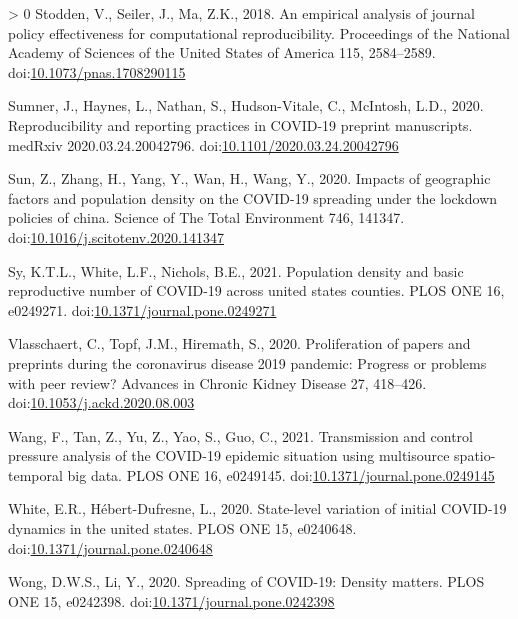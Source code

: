 \documentclass[]{elsarticle} %
\newlength{\cslhangindent}
\newenvironment{CSLReferences}[3] %
 {%
  \setlength{\parindent}{0pt}
  \ifodd #1 \everypar{\setlength{\hangindent}{\cslhangindent}}\ignorespaces\fi
  \ifnum #2 > 0
  \setlength{\parskip}{#2\baselineskip}
  \fi
 }%
 {}
\begin{document}
\begin{CSLReferences}{1}{0}
\leavevmode\hypertarget{ref-Stodden2018empirical}{}%
Stodden, V., Seiler, J., Ma, Z.K., 2018. An empirical analysis of
journal policy effectiveness for computational reproducibility.
Proceedings of the National Academy of Sciences of the United States of
America 115, 2584--2589.
doi:\href{https://doi.org/10.1073/pnas.1708290115}{10.1073/pnas.1708290115}

\leavevmode\hypertarget{ref-Sumner2020reproducibility}{}%
Sumner, J., Haynes, L., Nathan, S., Hudson-Vitale, C., McIntosh, L.D.,
2020. Reproducibility and reporting practices in COVID-19 preprint
manuscripts. medRxiv 2020.03.24.20042796.
doi:\href{https://doi.org/10.1101/2020.03.24.20042796}{10.1101/2020.03.24.20042796}

\leavevmode\hypertarget{ref-Sun2020impacts}{}%
Sun, Z., Zhang, H., Yang, Y., Wan, H., Wang, Y., 2020. Impacts of
geographic factors and population density on the COVID-19 spreading
under the lockdown policies of china. Science of The Total Environment
746, 141347.
doi:\href{https://doi.org/10.1016/j.scitotenv.2020.141347}{10.1016/j.scitotenv.2020.141347}

\leavevmode\hypertarget{ref-Sy2021population}{}%
Sy, K.T.L., White, L.F., Nichols, B.E., 2021. Population density and
basic reproductive number of COVID-19 across united states counties.
PLOS ONE 16, e0249271.
doi:\href{https://doi.org/10.1371/journal.pone.0249271}{10.1371/journal.pone.0249271}

\leavevmode\hypertarget{ref-Vlasschaert2020proliferation}{}%
Vlasschaert, C., Topf, J.M., Hiremath, S., 2020. Proliferation of papers
and preprints during the coronavirus disease 2019 pandemic: Progress or
problems with peer review? Advances in Chronic Kidney Disease 27,
418--426.
doi:\href{https://doi.org/10.1053/j.ackd.2020.08.003}{10.1053/j.ackd.2020.08.003}

\leavevmode\hypertarget{ref-Wang2021transmission}{}%
Wang, F., Tan, Z., Yu, Z., Yao, S., Guo, C., 2021. Transmission and
control pressure analysis of the COVID-19 epidemic situation using
multisource spatio-temporal big data. PLOS ONE 16, e0249145.
doi:\href{https://doi.org/10.1371/journal.pone.0249145}{10.1371/journal.pone.0249145}

\leavevmode\hypertarget{ref-White2020state}{}%
White, E.R., Hébert-Dufresne, L., 2020. State-level variation of initial
COVID-19 dynamics in the united states. PLOS ONE 15, e0240648.
doi:\href{https://doi.org/10.1371/journal.pone.0240648}{10.1371/journal.pone.0240648}

\leavevmode\hypertarget{ref-Wong2020spreading}{}%
Wong, D.W.S., Li, Y., 2020. Spreading of COVID-19: Density matters. PLOS
ONE 15, e0242398.
doi:\href{https://doi.org/10.1371/journal.pone.0242398}{10.1371/journal.pone.0242398}

\end{CSLReferences}
\end{document}
